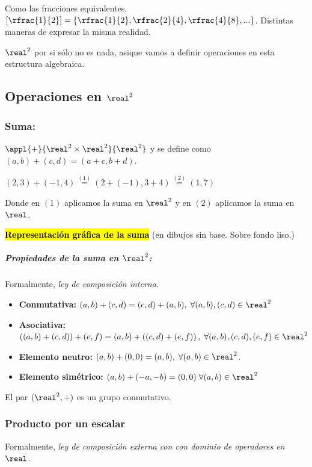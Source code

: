 \documentclass[palatino,nosec]{Docencia}
\begin{document}
Como las fracciones equivalentes. $[\rfrac{1}{2}] = \{\rfrac{1}{2},\rfrac{2}{4},\rfrac{4}{8},...\}$. Distintas maneras de expresar la misma realidad.



$\real^2$ por si sólo no es nada, asique vamos a definir operaciones en esta estructura algebraica.



\subsection{Operaciones en $\real^2$}
\subsubsection{Suma:}
$\appl{+}{\real^2\times\real^2}{\real^2}$  y se define como $(a,b)+(c,d) = (a+c,b+d)$.

\begin{example}
$(2,3) + (-1,4) \overset{(1)}{=} (2+(-1),3+4)  \overset{(2)}{=} (1,7)$

Donde en $(1)$ aplicamos la suma en $\real^2$ y en $(2)$ aplicamos la suma en $\real$.

\hl{\textbf{Representación gráfica de la suma}} (en dibujos sin base. Sobre fondo liso.)

\end{example}

\subparagraph{Propiedades de la suma en $\real^2$:} Formalmente, \textit{ley de composición interna.}

\begin{itemize}
	\item \textbf{Conmutativa: } $(a,b)+(c,d) = (c,d)+(a,b), \;\forall (a,b),(c,d)\in\real^2$
	\item \textbf{Asociativa: } $\left((a,b)+(c,d)\right) + (e,f) = (a,b)+\left((c,d)+(e,f)\right), \;\forall (a,b),(c,d),(e,f)\in\real^2$
	\item \textbf{Elemento neutro: } $(a,b) + (0,0) = (a,b), \;\forall (a,b)\in\real^2$.
	\item \textbf{Elemento simétrico: } $(a,b) + (-a,-b) = (0,0) \;\forall (a,b)\in\real^2$
\end{itemize}

\obs El par $(\real^2,+)$ es un grupo conmutativo.

\subsubsection{Producto por un escalar} Formalmente, \textit{ley de composición externa con con dominio de operadores en $\real$.}
\end{document}
